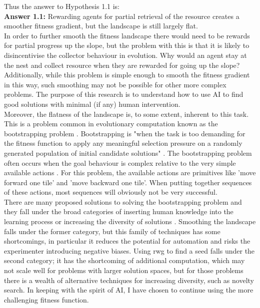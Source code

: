 \documentclass[12pt]{article}
\begin{document}
Thus the answer to Hypothesis 1.1 is:\\

\textbf{Answer 1.1:} Rewarding agents for partial retrieval of the resource creates a smoother fitness gradient, but the landscape is still largely flat.\\

In order to further smooth the fitness landscape there would need to be rewards for partial progress up the slope, but the problem with this is that it is likely to disincentivise the collector behaviour in evolution.
Why would an agent stay at the nest and collect resource when they are rewarded for going up the slope? 
Additionally, while this problem is simple enough to smooth the fitness gradient in this way, such smoothing may not be possible for other more complex problems.
The purpose of this research is to understand how to use AI to find good solutions with minimal (if any) human intervention.\\

Moreover, the flatness of the landscape is, to some extent, inherent to this task.
This is a problem common in evolutionary computation known as the bootstrapping problem \cite{Silva:EC:2016, Wei:ALR:2019}.
Bootstrapping is "when the task is too demanding for the fitness function to apply any meaningful selection pressure on a randomly generated population of initial candidate solutions" \cite{Silva:EC:2016}.
The bootstrapping problem often occurs when the goal behaviour is complex relative to the very simple available actions \cite{Wei:ALR:2019}.
For this problem, the available actions are primitives like 'move forward one tile' and 'move backward one tile'.
When putting together sequences of these actions, most sequences will obviously not be very successful.\\

There are many proposed solutions to solving the bootstrapping problem and they fall under the broad categories of inserting human knowledge into the learning process or increasing the diversity of solutions \cite{Silva:EC:2016}.
Smoothing the landscape falls under the former category, but this family of techniques has some shortcomings, in particular it reduces the potential for automation and risks the experimenter introducing negative biases.
Using rwg to find a seed falls under the second category; it has the shortcoming of additional computation, which may not scale well for problems with larger solution spaces, but for those problems there is a wealth of alternative techniques for increasing diversity, such as novelty search.
In keeping with the spirit of AI, I have chosen to continue using the more challenging fitness function.
\end{document}
